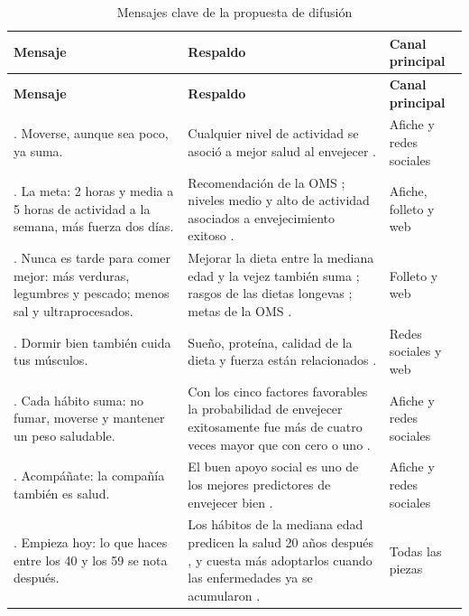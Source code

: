 \documentclass[12pt, letterpaper, table, xcdraw]{extarticle}
\renewcommand{\arraystretch}{2}
\newcommand{\leyendaFont}[1]{\fontsize{10}{12}\selectfont #1}
\begin{document}
{\footnotesize
\renewcommand{\arraystretch}{1.3}
\begin{longtable}{|>{\raggedright\arraybackslash}p{4.6cm}|>{\raggedright\arraybackslash}p{5.6cm}|>{\raggedright\arraybackslash}p{3.4cm}|}
    \caption{\leyendaFont{Mensajes clave de la propuesta de difusión}}
    \label{tab:mensajes}\\
    \hline
    \textbf{Mensaje} & \textbf{Respaldo} & \textbf{Canal principal} \\ \hline
    \endfirsthead
    \hline
    \textbf{Mensaje} & \textbf{Respaldo} & \textbf{Canal principal} \\ \hline
    \endhead
    1. Moverse, aunque sea poco, ya suma. & Cualquier nivel de actividad se asoció a mejor salud al envejecer \parencite{morenoagostino2020}. & Afiche y redes sociales \\ \hline
    2. La meta: 2 horas y media a 5 horas de actividad a la semana, más fuerza dos días. & Recomendación de la OMS \parencite{oms2020}; niveles medio y alto de actividad asociados a envejecimiento exitoso \parencite{zhang2025}. & Afiche, folleto y web \\ \hline
    3. Nunca es tarde para comer mejor: más verduras, legumbres y pescado; menos sal y ultraprocesados. & Mejorar la dieta entre la mediana edad y la vejez también suma \parencite{zhou2023}; rasgos de las dietas longevas \parencite{dominguez2022}; metas de la OMS \parencite{puri2023}. & Folleto y web \\ \hline
    4. Dormir bien también cuida tus músculos. & Sueño, proteína, calidad de la dieta y fuerza están relacionados \parencite{kuczmarski2025}. & Redes sociales y web \\ \hline
    5. Cada hábito suma: no fumar, moverse y mantener un peso saludable. & Con los cinco factores favorables la probabilidad de envejecer exitosamente fue más de cuatro veces mayor que con cero o uno \parencite{bosnes2019}. & Afiche y redes sociales \\ \hline
    6. Acompáñate: la compañía también es salud. & El buen apoyo social es uno de los mejores predictores de envejecer bien \parencite{bosnes2019}. & Afiche y redes sociales \\ \hline
    7. Empieza hoy: lo que haces entre los 40 y los 59 se nota después. & Los hábitos de la mediana edad predicen la salud 20 años después \parencite{bosnes2019}, y cuesta más adoptarlos cuando las enfermedades ya se acumularon \parencite{zhu2025}. & Todas las piezas \\ \hline
\end{longtable}
}
\end{document}

